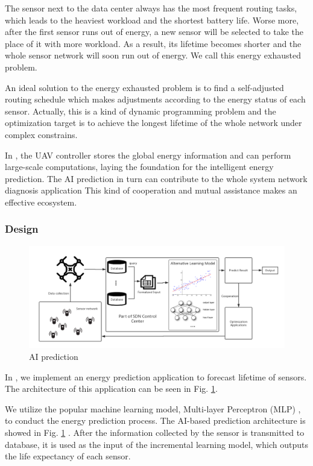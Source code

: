 The sensor next to the data center always has the most frequent routing tasks, which leads to
the heaviest workload and the shortest battery life. Worse more, after the
first sensor runs out of energy, a new sensor will be selected to take the place 
of it with more workload. As a result, its lifetime becomes shorter and the whole 
sensor network will soon run out of energy. We call this energy exhausted problem.

An ideal solution to the energy exhausted problem is to find a self-adjusted routing schedule which 
makes adjustments according to the energy status of each sensor. 
Actually, this is a kind of dynamic programming problem and
the optimization target is to achieve the longest lifetime of the whole network under
complex constrains. 

In {\sdn}, the UAV controller stores the global energy information 
and can perform large-scale computations, laying 
the foundation for the intelligent energy prediction.
The AI prediction in turn can contribute to the whole system  network diagnosis application
This kind of cooperation and mutual assistance makes {\sdn} an effective ecosystem.



\subsubsection{Design}

\begin{figure}[htbp]
	\centering
	\includegraphics[width=5in]{Figure/SDWN-AIprediction}
	\caption{AI prediction}
	\label{prediction}
\end{figure}

In {\sdn},  we implement an energy prediction application 
to forecast lifetime of sensors. The architecture of this application
can be seen in Fig. \ref{prediction}.


We utilize the popular machine learning model, 
Multi-layer Perceptron (MLP) \cite{Harvey1988An},
to conduct the energy prediction process. 
The AI-based prediction architecture is  showed in Fig. \ref{prediction} .
After the information collected by the sensor is transmitted to database, it is used as
the input of the incremental learning model, which outputs the
life expectancy of each sensor. 

